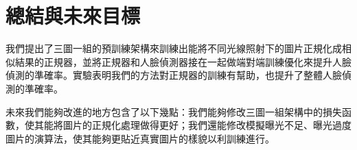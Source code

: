 \chapter{總結與未來目標}
\label{c:conclusion}

我們提出了三圖一組的預訓練架構來訓練出能將不同光線照射下的圖片正規化成相似結果的正規器，並將正規器和人臉偵測器接在一起做端對端訓練優化來提升人臉偵測的準確率。實驗表明我們的方法對正規器的訓練有幫助，也提升了整體人臉偵測的準確率。

未來我們能夠改進的地方包含了以下幾點：我們能夠修改三圖一組架構中的損失函數，使其能將圖片的正規化處理做得更好；我們還能修改模擬曝光不足、曝光過度圖片的演算法，使其能夠更貼近真實圖片的樣貌以利訓練進行。
